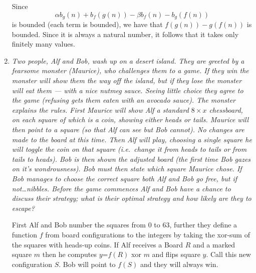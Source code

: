 \documentclass{article}
\begin{document}
\begin{enumerate}[1.]
Since 
\[
	\alpha b_{g} (n) + b_{f} (g(n)) - \beta b_{f} (n) - b_{g} (f(n))
\]
is bounded (each term is bounded), we have that $f(g(n)) - g(f(n))$ is bounded. Since it is always a natural number, it follows that it takes only finitely many values.

\vspace{6pt}
\item %
{\itshape Two people, Alf and Bob, wash up on a desert island. They are greeted by a fearsome monster (Maurice), who challenges them to a game. If they win the monster will show them the way off the island, but if they lose the monster will eat them --- with a nice nutmeg sauce. Seeing little choice they agree to the game (refusing gets them eaten with an avocado sauce). The monster explains the rules. First Maurice will show Alf a standard $8 \times x$ chessboard, on each square of which is a coin, showing either heads or tails. Maurice will then point to a square (so that Alf can see but Bob cannot). No changes are made to the board at this time. Then Alf will play, choosing a single square he will toggle the coin on that square (i.e.\ change it from heads to tails or from tails to heads). Bob is then shown the adjusted board (the first time Bob gazes on it's wondrousness). Bob must then state which square Maurice chose. If Bob manages to choose the correct square both Alf and Bob go free, but if not\dots nibbles. Before the game commences Alf and Bob have a chance to discuss their strategy; what is their optimal strategy and how likely are they to escape?}

First Alf and Bob number the squares from 0 to 63, further they define a function $f$ from board configurations to the integers by taking the xor-sum of the squares with heads-up coins. If Alf receives a Board $R$ and a marked square $m$ then he computes $y$=$f(R)$ xor $m$ and flips square  $y$. Call this new configuration $S$. Bob will point to $f(S)$ and they will always win.  
\end{enumerate}
\end{document}
